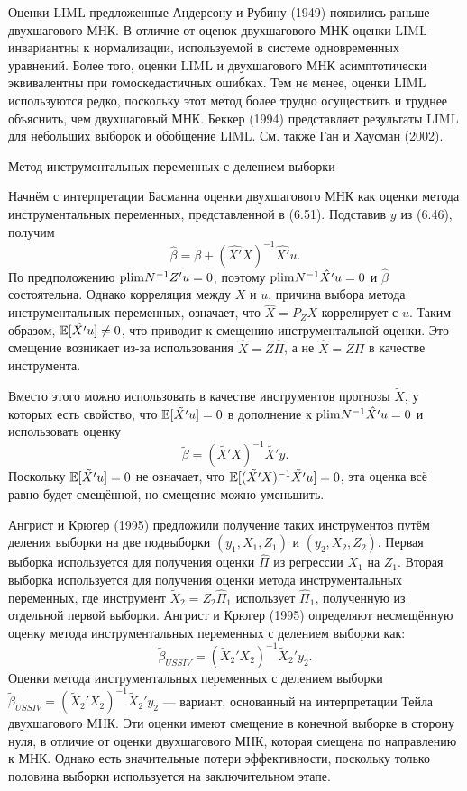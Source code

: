 Оценки LIML предложенные Андерсону и Рубину (1949) появились раньше двухшагового МНК. В отличие от оценок двухшагового МНК оценки LIML инвариантны к нормализации, используемой в системе одновременных уравнений. Более того, оценки LIML и двухшагового МНК асимптотически эквивалентны при гомоскедастичных ошибках. Тем не менее, оценки LIML используются редко, поскольку этот метод более трудно осуществить и труднее объяснить, чем двухшаговый МНК. Беккер (1994) представляет результаты LIML для небольших выборок и обобщение LIML. См. также Ган и Хаусман (2002).

\begin{center}
Метод инструментальных переменных с делением выборки
\end{center}

Начнём с интерпретации Басманна оценки двухшагового МНК как оценки метода инструментальных переменных, представленной в (6.51). Подставив $y$ из (6.46), получим
\[
\hat{\beta}=\beta+(\hat{X'} X)^{-1} \hat{X'} u.
\]
По предположению $\mathrm{plim } N^{-1} Z' u=0$, поэтому $\mathrm{plim }  N^{-1} \hat{X'} u=0$ и $\hat{\beta}$ состоятельна. Однако корреляция между $X$ и $u$, причина выбора метода инструментальных переменных, означает, что $\hat{X}=P_{Z} X$ коррелирует с $u$. Таким образом, $\mathbb{E}[\hat{X'}u] \not= 0$, что приводит к смещению инструментальной оценки. Это смещение
возникает из-за использования $\hat{X}=Z \hat{\Pi}$, а не $\hat{X}=Z \Pi$ в качестве инструмента.

Вместо этого  можно использовать в качестве инструментов прогнозы $\tilde{X}$, у которых есть свойство, что $\mathbb{E}[\tilde{X'}u] = 0$ в дополнение к $\mathrm{plim }  N^{-1} \hat{X'} u=0$ и использовать оценку
\[
\tilde{\beta}=(\tilde{X'}X)^{-1} \tilde{X'} y.
\]
Поскольку $\mathbb{E}[\tilde{X'}u]=0$ не означает, что $\mathbb{E}[(\tilde{X'}X)^{-1} \tilde{X'} u]=0$, эта оценка всё равно будет смещённой, но смещение можно уменьшить.

Ангрист и Крюгер (1995) предложили получение таких инструментов путём деления выборки на две подвыборки $(y_1,X_1,Z_1)$ и $(y_2,X_2,Z_2)$. Первая выборка используется для получения оценки  $\hat{\Pi}$ из регрессии $X_1$ на $Z_1$. Вторая выборка используется для получения оценки метода инструментальных переменных, где инструмент $\tilde{X}_2=Z_2 \hat{\Pi}_1$ использует $\hat{\Pi}_1$, полученную из отдельной первой выборки. Ангрист и Крюгер (1995) определяют несмещённую оценку метода инструментальных переменных с делением выборки как:
\[
\tilde{\beta}_{USSIV}=(\tilde{X}_2' X_2)^{-1} \tilde{X}_2' y_2.
\]
Оценки метода инструментальных переменных с делением выборки $\tilde{\beta}_{USSIV}=(\tilde{X}_2' X_2)^{-1} \tilde{X}_2' y_2$ --- вариант, основанный на интерпретации Тейла двухшагового МНК. Эти оценки имеют смещение в конечной выборке в сторону нуля, в отличие от оценки двухшагового МНК, которая смещена по направлению к МНК. Однако есть значительные потери эффективности, поскольку только половина выборки используется на заключительном этапе.


